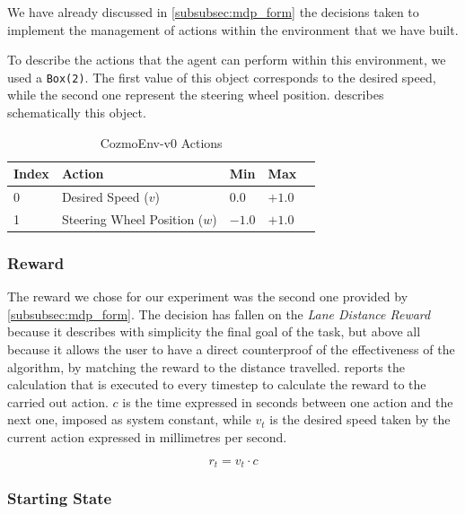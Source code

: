 We have already discussed in \vref{subsubsec:mdp_form} the decisions taken to implement the management of actions within the environment that we have built.

To describe the actions that the agent can perform within this environment, we used a \texttt{Box(2)}. The first value of this object corresponds to the desired speed, while the second one represent the steering wheel position.  describes schematically this object.

\begin{table}[!h]
	\centering
	\caption{CozmoEnv-v0 Actions}
	\label{table:cozmo_actions}
	\begin{tabular}{@{}lllll@{}}
		\toprule
		Index & Action                        & Min    & Max    \\ \midrule
		0     & Desired Speed ($v$)           & $0.0$  & $+1.0$ \\
		1     & Steering Wheel Position ($w$) & $-1.0$ & $+1.0$ \\

		\bottomrule
	\end{tabular}
\end{table}

\subsubsection{Reward}

The reward we chose for our experiment was the second one provided by \vref{subsubsec:mdp_form}.
The decision has fallen on the \textit{Lane Distance Reward} because it describes with simplicity the final goal of the task, but above all because it allows the user to have a direct counterproof of the effectiveness of the algorithm, by matching the reward to the distance travelled.
 reports the calculation that is executed to every timestep to calculate the reward to the carried out action.
$c$ is the time expressed in seconds between one action and the next one, imposed as system constant, while $v_t$ is the desired speed taken by the current action expressed in millimetres per second.

\begin{equation}
	\label{eq:reward_fun}
	r_t = v_t \cdot c
\end{equation}

\subsubsection{Starting State}

